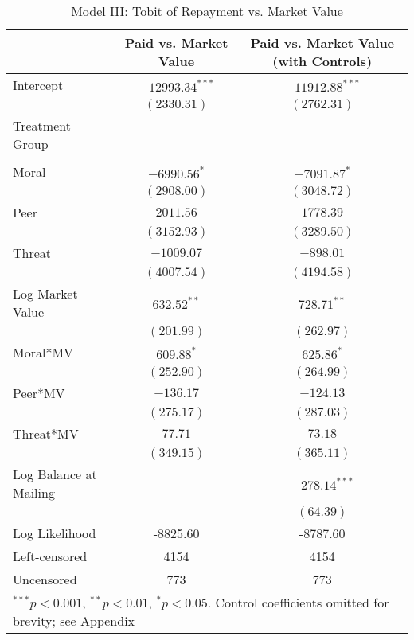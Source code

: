 \documentclass[12pt,titlepage]{article}
\begin{document}
\begin{table}[htbp]
\begin{center}
\begin{tabular}{l c c }
\hline
                       & Paid vs. Market Value & Paid vs. Market Value (with Controls) \\
\hline
Intercept              & $-12993.34^{***}$ & $-11912.88^{***}$ \\
                       & $(2330.31)$       & $(2762.31)$       \\
Treatment Group        &                   &                   \\
                       &                   &                   \\
\quad Moral            & $-6990.56^{*}$    & $-7091.87^{*}$    \\
                       & $(2908.00)$       & $(3048.72)$       \\
\quad Peer             & $2011.56$         & $1778.39$         \\
                       & $(3152.93)$       & $(3289.50)$       \\
\quad Threat           & $-1009.07$        & $-898.01$         \\
                       & $(4007.54)$       & $(4194.58)$       \\
Log Market Value       & $632.52^{**}$     & $728.71^{**}$     \\
                       & $(201.99)$        & $(262.97)$        \\
Moral*MV               & $609.88^{*}$      & $625.86^{*}$      \\
                       & $(252.90)$        & $(264.99)$        \\
Peer*MV                & $-136.17$         & $-124.13$         \\
                       & $(275.17)$        & $(287.03)$        \\
Threat*MV              & $77.71$           & $73.18$           \\
                       & $(349.15)$        & $(365.11)$        \\
Log Balance at Mailing &                   & $-278.14^{***}$   \\
                       &                   & $(64.39)$         \\
\hline
Log Likelihood         & -8825.60          & -8787.60          \\
Left-censored          & 4154              & 4154              \\
Uncensored             & 773               & 773               \\
\hline
\multicolumn{3}{l}{\scriptsize{$^{***}p<0.001$, $^{**}p<0.01$, $^*p<0.05$. Control coefficients omitted for brevity; see Appendix}}
\end{tabular}
\caption{Model III: Tobit of Repayment vs. Market Value}
\label{table:modelIII}
\end{center}
\end{table}
\end{document}
